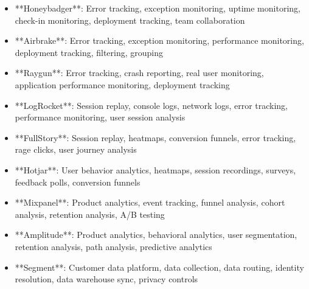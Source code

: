 \documentclass[11pt,a4paper]{article}
\begin{document}
\begin{itemize}
\item **Honeybadger**: Error tracking, exception monitoring, uptime monitoring, check-in monitoring, deployment tracking, team collaboration
\end{itemize}

\begin{itemize}
\item **Airbrake**: Error tracking, exception monitoring, performance monitoring, deployment tracking, filtering, grouping
\end{itemize}

\begin{itemize}
\item **Raygun**: Error tracking, crash reporting, real user monitoring, application performance monitoring, deployment tracking
\end{itemize}

\begin{itemize}
\item **LogRocket**: Session replay, console logs, network logs, error tracking, performance monitoring, user session analysis
\end{itemize}

\begin{itemize}
\item **FullStory**: Session replay, heatmaps, conversion funnels, error tracking, rage clicks, user journey analysis
\end{itemize}

\begin{itemize}
\item **Hotjar**: User behavior analytics, heatmaps, session recordings, surveys, feedback polls, conversion funnels
\end{itemize}

\begin{itemize}
\item **Mixpanel**: Product analytics, event tracking, funnel analysis, cohort analysis, retention analysis, A/B testing
\end{itemize}

\begin{itemize}
\item **Amplitude**: Product analytics, behavioral analytics, user segmentation, retention analysis, path analysis, predictive analytics
\end{itemize}

\begin{itemize}
\item **Segment**: Customer data platform, data collection, data routing, identity resolution, data warehouse sync, privacy controls
\end{itemize}
\end{document}
